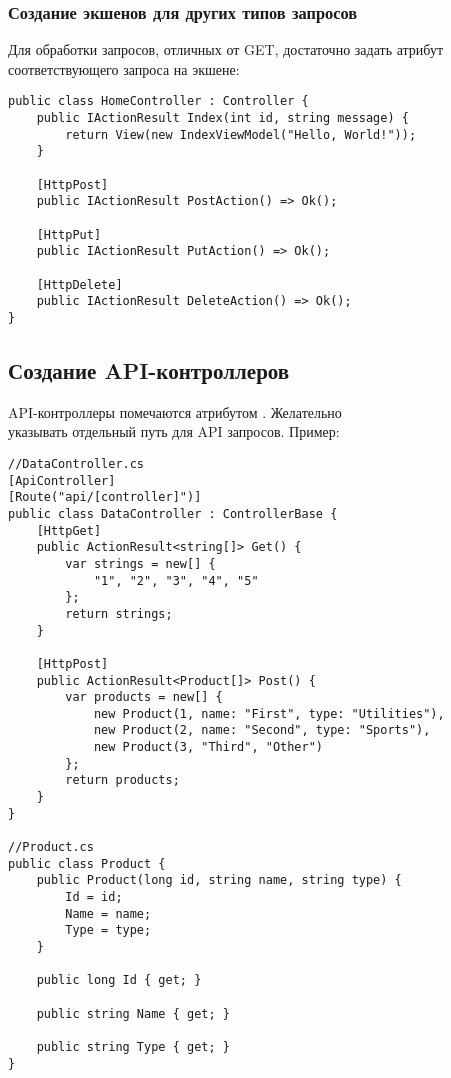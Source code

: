 \documentclass[a4paper,14pt]{extarticle}
\begin{document}
\subsubsection{Создание экшенов для других типов запросов}
Для обработки запросов, отличных от GET, достаточно задать атрибут
соответствующего запроса на экшене:

\begin{lstlisting}
public class HomeController : Controller {
    public IActionResult Index(int id, string message) {
        return View(new IndexViewModel("Hello, World!"));
    }

    [HttpPost]
    public IActionResult PostAction() => Ok();

    [HttpPut]
    public IActionResult PutAction() => Ok();

    [HttpDelete]
    public IActionResult DeleteAction() => Ok();
}
\end{lstlisting}

\subsection{Создание API-контроллеров}

API-контроллеры помечаются атрибутом \code{[ApiController]}. Желательно\\указывать
отдельный путь для API запросов. Пример:

\begin{lstlisting}
//DataController.cs
[ApiController]
[Route("api/[controller]")]
public class DataController : ControllerBase {
    [HttpGet]
    public ActionResult<string[]> Get() {
        var strings = new[] {
            "1", "2", "3", "4", "5"
        };
        return strings;
    }

    [HttpPost]
    public ActionResult<Product[]> Post() {
        var products = new[] {
            new Product(1, name: "First", type: "Utilities"),
            new Product(2, name: "Second", type: "Sports"),
            new Product(3, "Third", "Other")
        };
        return products;
    }
}

//Product.cs
public class Product {
    public Product(long id, string name, string type) {
        Id = id;
        Name = name;
        Type = type;
    }

    public long Id { get; }

    public string Name { get; }

    public string Type { get; }
}
\end{lstlisting}
\end{document}
